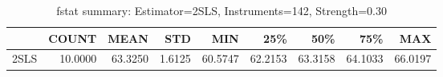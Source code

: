 \begin{table}[ht]
\centering
\caption{fstat summary: Estimator=2SLS, Instruments=142, Strength=0.30}
\begin{tabular}{lrrrrrrrr}
\toprule
 & COUNT & MEAN & STD & MIN & 25\% & 50\% & 75\% & MAX \\
\midrule
2SLS & 10.0000 & 63.3250 & 1.6125 & 60.5747 & 62.2153 & 63.3158 & 64.1033 & 66.0197 \\
\bottomrule
\end{tabular}
\end{table}
